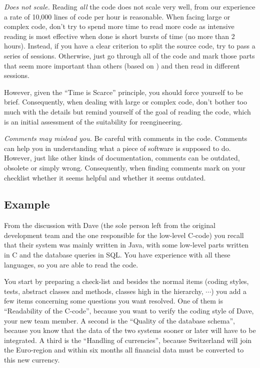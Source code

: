 \documentclass[a4paper,10pt,twoside]{book}
\begin{document}
\begin{bulletlist}
  \item \emph{Does not scale.}
Reading \emph{all} the code does not scale very well, from our experience a rate of 10,000 lines of code per hour is reasonable. When facing large or complex code, don't try to spend more time to read more code as intensive reading is most effective when done is short bursts of time (no more than 2 hours). Instead, if you have a clear criterion to split the source code, try to pass a series of sessions. Otherwise, just go through all of the code and mark those parts that seem more important than others (based on ) and then read in different sessions.

However, given the ``Time is Scarce'' principle, you should force yourself to be brief. Consequently, when dealing with large or complex code, don't bother too much with the details but remind yourself of the goal of reading the code, which is an initial assessment of the suitability for reengineering.


  \item \emph{Comments may mislead you.}
Be careful with comments in the code. Comments can help you in understanding what a piece of software is supposed to do. However, just like other kinds of documentation, comments can be outdated, obsolete or simply wrong. Consequently, when finding comments mark on your checklist whether it seems helpful and whether it seems outdated.

\end{bulletlist}

\subsection*{Example}

From the discussion with Dave (the sole person left from the original development team and the one responsible for the low-level C-code) you recall that their system was mainly written in Java, with some low-level parts written in C and the database queries in SQL. You have experience with all these languages, so you are able to read the code.

You start by preparing a check-list and besides the normal items (coding styles, tests, abstract classes and methods, classes high in the hierarchy, $\cdots$) you add a few items concerning some questions you want resolved. One of them is ``Readability of the C-code'', because you want to verify the coding style of Dave, your new team member. A second is the ``Quality of the database schema'', because you know that the data of the two systems sooner or later will have to be integrated. A third is the ``Handling of currencies'', because Switzerland will join the Euro-region and within six months all financial data must be converted to this new currency.
\end{document}
